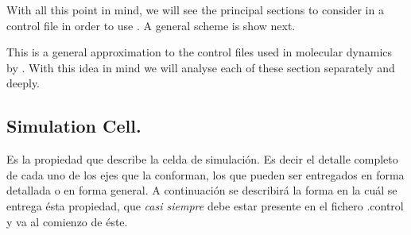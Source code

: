 With all this point in mind, we will see the principal sections to consider in
a control file in order to use {\lpmd}. A general scheme is show next.


This is a general approximation to the control files used in molecular dynamics
by {\lpmd}. With this idea in mind we will analyse each of these section
separately and deeply.

\subsection{Simulation Cell.}

Es la propiedad que describe la celda de simulaci\'on. Es decir el detalle
completo de cada uno de los ejes que la conforman, los que pueden ser entregados
en forma detallada o en forma general. A continuaci\'on se describir\'a la forma
en la cu\'al se entrega \'esta propiedad, que \textit{casi siempre} debe estar
presente en el fichero .control y va al comienzo de \'este.

